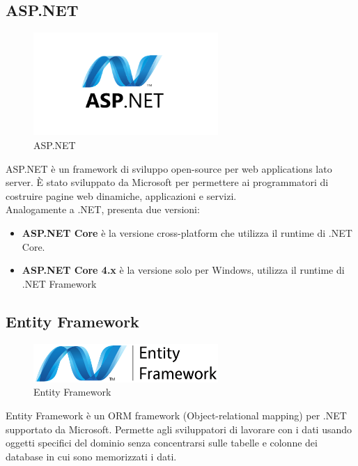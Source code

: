 \subsection{ASP.NET}
\begin{figure}[h]
\begin{center}
	\includegraphics[width=7cm]{images/aspnet.png}
	\caption{ASP.NET}\label{fig:aspnet}
\end{center}
\end{figure}
ASP.NET è un framework di sviluppo open-source per web applications lato server. È stato sviluppato da Microsoft per permettere ai programmatori di costruire pagine web dinamiche, applicazioni e servizi.\cite{ASPNET}\\
Analogamente a .NET, presenta due versioni:
\begin{itemize}
\item \textbf{ASP.NET Core} è la versione cross-platform che utilizza il runtime di .NET Core.
\item \textbf{ASP.NET Core 4.x} è la versione solo per Windows, utilizza il runtime di .NET Framework
\end{itemize}

\subsection{Entity Framework}
\begin{figure}[h]
\begin{center}
	\includegraphics[width=7cm]{images/entityframework.png}
	\caption{Entity Framework}\label{fig:entityframework}
\end{center}
\end{figure}
Entity Framework è un ORM framework (Object-relational mapping) per .NET supportato da Microsoft. Permette agli sviluppatori di lavorare con i dati usando oggetti specifici del dominio senza concentrarsi sulle tabelle e colonne dei database in cui sono memorizzati i dati.

